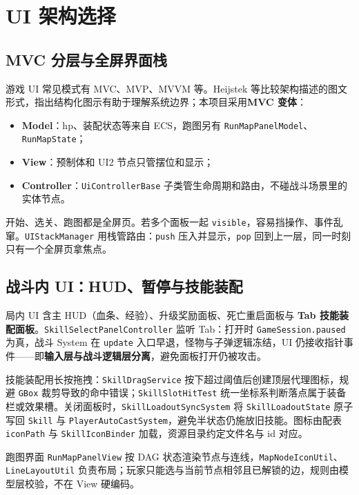 \documentclass[UTF8,a4paper]{ctexart}
\begin{document}
\section{UI 架构选择}
\label{sec:ui-arch}

\subsection{MVC 分层与全屏界面栈}

游戏 UI 常见模式有 MVC、MVP、MVVM 等\cite{heijstek2011empirical}。Heijstek 等比较架构描述的图文形式，指出结构化图示有助于理解系统边界；本项目采用\textbf{MVC 变体}：

\begin{itemize}
  \item \textbf{Model}：hp、装配状态等来自 ECS，跑图另有 \texttt{RunMapPanelModel}、\texttt{RunMapState}；
  \item \textbf{View}：预制体和 UI2 节点只管摆位和显示；
  \item \textbf{Controller}：\texttt{UiControllerBase} 子类管生命周期和路由，不碰战斗场景里的实体节点。
\end{itemize}

开始、选关、跑图都是全屏页。若多个面板一起 \texttt{visible}，容易挡操作、事件乱窜。\texttt{UIStackManager} 用栈管路由：\texttt{push} 压入并显示，\texttt{pop} 回到上一层，同一时刻只有一个全屏页拿焦点\cite{gregory2018game}。

\subsection{战斗内 UI：HUD、暂停与技能装配}

局内 UI 含主 HUD（血条、经验）、升级奖励面板、死亡重启面板与 \textbf{Tab 技能装配面板}。\texttt{SkillSelectPanelController} 监听 Tab：打开时 \texttt{GameSession.paused} 为真，战斗 System 在 \texttt{update} 入口早退，怪物与子弹逻辑冻结，UI 仍接收指针事件——即\textbf{输入层与战斗逻辑层分离}，避免面板打开仍被攻击。

技能装配用长按拖拽：\texttt{SkillDragService} 按下超过阈值后创建顶层代理图标，规避 \texttt{GBox} 裁剪导致的命中错误；\texttt{SkillSlotHitTest} 统一坐标系判断落点属于装备栏或效果槽。关闭面板时，\texttt{SkillLoadoutSyncSystem} 将 \texttt{SkillLoadoutState} 原子写回 \texttt{Skill} 与 \texttt{PlayerAutoCastSystem}，避免半状态仍施放旧技能。图标由配表 \texttt{iconPath} 与 \texttt{SkillIconBinder} 加载，资源目录约定文件名与 id 对应。

跑图界面 \texttt{RunMapPanelView} 按 DAG 状态渲染节点与连线，\texttt{MapNodeIconUtil}、\texttt{LineLayoutUtil} 负责布局；玩家只能选与当前节点相邻且已解锁的边，规则由模型层校验，不在 View 硬编码。
\end{document}

